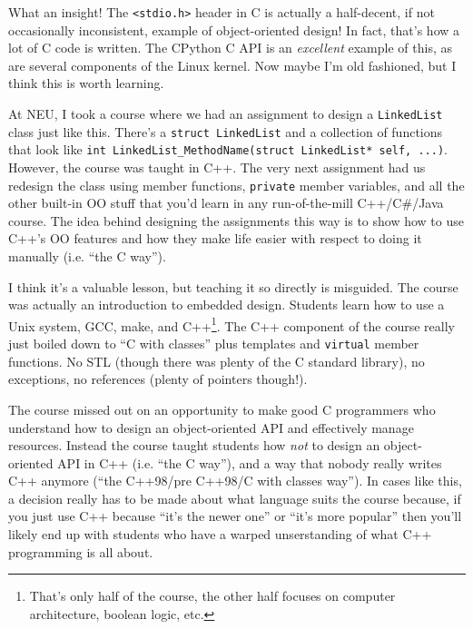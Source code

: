\documentclass{article}
\begin{document}
What an insight!  The \lstinline{<stdio.h>} header in C is actually a half-decent, if not occasionally inconsistent, example of object-oriented design!  In fact, that's how a lot of C code is written.  The CPython C API is an \emph{excellent} example of this, as are several components of the Linux kernel.  Now maybe I'm old fashioned, but I think this is worth learning.  

At NEU, I took a course where we had an assignment to design a \lstinline{LinkedList} class just like this.  There's a \lstinline{struct LinkedList} and a collection of functions that look like \lstinline{int LinkedList_MethodName(struct LinkedList* self, ...)}.  However, the course was taught in C++.  The very next assignment had us redesign the class using member functions, \lstinline{private} member variables, and all the other built-in OO stuff that you'd learn in any run-of-the-mill C++/C\#/Java course.  The idea behind designing the assignments this way is to show how to use C++'s OO features and how they make life easier with respect to doing it manually (i.e. ``the C way'').

I think it's a valuable lesson, but teaching it so directly is misguided.  The course was actually an introduction to embedded design.  Students learn how to use a Unix system, GCC, make, and C++\footnote{That's only half of the course, the other half focuses on computer architecture, boolean logic, etc.}.  The C++ component of the course really just boiled down to ``C with classes'' plus templates and \lstinline{virtual} member functions.  No STL (though there was plenty of the C standard library), no exceptions, no references (plenty of pointers though!).

The course missed out on an opportunity to make good C programmers who understand how to design an object-oriented API and effectively manage resources.  Instead the course taught students how \emph{not} to design an object-oriented API in C++ (i.e. ``the C way''), and a way that nobody really writes C++ anymore (``the C++98/pre C++98/C with classes way'').  In cases like this, a decision really has to be made about what language suits the course because, if you just use C++ because ``it's the newer one'' or ``it's more popular'' then you'll likely end up with students who have a warped unserstanding of what C++ programming is all about.
\end{document}
